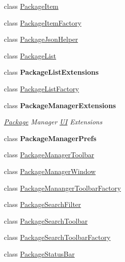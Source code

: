 \begin{DoxyCompactItemize}
class \mbox{\hyperlink{class_unity_editor_1_1_package_manager_1_1_u_i_1_1_package_item}{Package\+Item}}
\item 
class \mbox{\hyperlink{class_unity_editor_1_1_package_manager_1_1_u_i_1_1_package_item_factory}{Package\+Item\+Factory}}
\item 
class \mbox{\hyperlink{class_unity_editor_1_1_package_manager_1_1_u_i_1_1_package_json_helper}{Package\+Json\+Helper}}
\item 
class \mbox{\hyperlink{class_unity_editor_1_1_package_manager_1_1_u_i_1_1_package_list}{Package\+List}}
\item 
class {\bfseries Package\+List\+Extensions}
\item 
class \mbox{\hyperlink{class_unity_editor_1_1_package_manager_1_1_u_i_1_1_package_list_factory}{Package\+List\+Factory}}
\item 
class {\bfseries Package\+Manager\+Extensions}
\begin{DoxyCompactList}\small\item\em \mbox{\hyperlink{class_unity_editor_1_1_package_manager_1_1_u_i_1_1_package}{Package}} Manager \mbox{\hyperlink{namespace_unity_editor_1_1_package_manager_1_1_u_i}{UI}} Extensions \end{DoxyCompactList}\item 
class {\bfseries Package\+Manager\+Prefs}
\item 
class \mbox{\hyperlink{class_unity_editor_1_1_package_manager_1_1_u_i_1_1_package_manager_toolbar}{Package\+Manager\+Toolbar}}
\item 
class \mbox{\hyperlink{class_unity_editor_1_1_package_manager_1_1_u_i_1_1_package_manager_window}{Package\+Manager\+Window}}
\item 
class \mbox{\hyperlink{class_unity_editor_1_1_package_manager_1_1_u_i_1_1_package_mananger_toolbar_factory}{Package\+Mananger\+Toolbar\+Factory}}
\item 
class \mbox{\hyperlink{class_unity_editor_1_1_package_manager_1_1_u_i_1_1_package_search_filter}{Package\+Search\+Filter}}
\item 
class \mbox{\hyperlink{class_unity_editor_1_1_package_manager_1_1_u_i_1_1_package_search_toolbar}{Package\+Search\+Toolbar}}
\item 
class \mbox{\hyperlink{class_unity_editor_1_1_package_manager_1_1_u_i_1_1_package_search_toolbar_factory}{Package\+Search\+Toolbar\+Factory}}
\item 
class \mbox{\hyperlink{class_unity_editor_1_1_package_manager_1_1_u_i_1_1_package_status_bar}{Package\+Status\+Bar}}

\end{DoxyCompactItemize}

